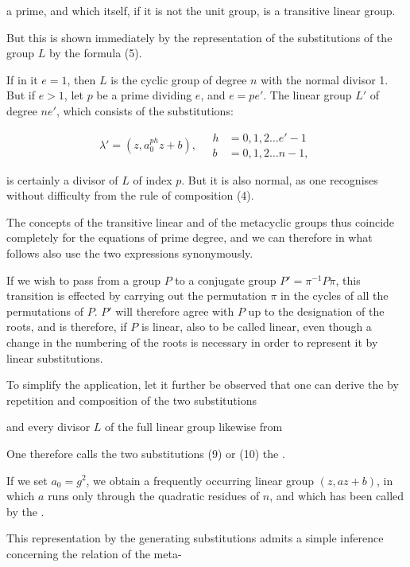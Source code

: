 a prime, and which itself, if it is not the unit group, is a transitive linear group.

But this is shown immediately by the representation of the substitutions of the group $L$ by the formula (5).

If in it $e=1$, then $L$ is the cyclic group of degree $n$ with the normal divisor 1. But if $e>1$, let $p$ be a prime dividing $e$, and $e=pe'$. The linear group $L'$ of degree $ne'$, which consists of the substitutions:

\[
\lambda' = (z, a_0^{ph} z + b), \quad
\begin{aligned}
h &= 0, 1, 2 \ldots e'-1\\
b &= 0, 1, 2 \ldots n-1,
\end{aligned}
\]

is certainly a divisor of $L$ of index $p$. But it is also normal, as one recognises without difficulty from the rule of composition (4).

The concepts of the transitive linear and of the metacyclic groups thus coincide completely for the equations of prime degree, and we can therefore in what follows also use the two expressions synonymously.

If we wish to pass from a group $P$ to a conjugate group $P' = \pi^{-1}P\pi$, this transition is effected by carrying out the permutation $\pi$ in the cycles of all the permutations of $P$. $P'$ will therefore agree with $P$ up to the designation of the roots, and is therefore, if $P$ is linear, also to be called linear, even though a change in the numbering of the roots is necessary in order to represent it by linear substitutions.

To simplify the application, let it further be observed that one can derive the  by repetition and composition of the two substitutions


and every divisor $L$ of the full linear group likewise from


One therefore calls the two substitutions (9) or (10) the .

If we set $a_0 = g^2$, we obtain a frequently occurring linear group $(z, az+b)$, in which $a$ runs only through the quadratic residues of $n$, and which has been called by  the .

This representation by the generating substitutions admits a simple inference concerning the relation of the meta-
